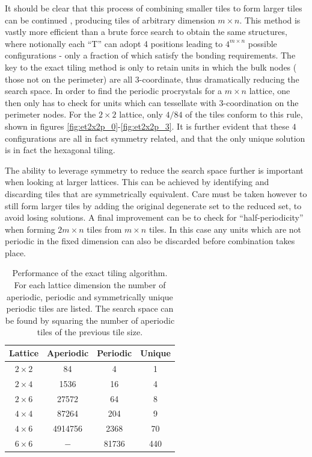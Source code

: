 It should be clear that this process of combining smaller tiles to form larger tiles can be continued \adinfinitum{}, producing tiles of arbitrary dimension $m\times n$.
This method is vastly more efficient than a brute force search to obtain the same structures, where notionally each ``T'' can adopt 4 positions leading to $4^{m\times n}$ possible configurations - only a fraction of which satisfy the bonding requirements.
The key to the exact tiling method is only to retain units in which the bulk nodes (\ie{} those not on the perimeter) are all 3\--coordinate, thus dramatically reducing the search space.
In order to find the periodic procrystals for a $m\times n$ lattice, one then only has to check for units which can tessellate with $3$\--coordination on the perimeter nodes.
For the $2\times 2$ lattice, only $4 / 84$ of the tiles conform to this rule, shown in figures \ref{fig:et2x2p_0}\--\ref{fig:et2x2p_3}.
It is further evident that these $4$ configurations are all in fact symmetry related, and that the only unique solution is in fact the hexagonal tiling.

The ability to leverage symmetry to reduce the search space further is important when looking at larger lattices. 
This can be achieved by identifying and discarding tiles that are symmetrically equivalent.
Care must be taken however to still form larger tiles by adding the original degenerate set to the reduced set, to avoid losing solutions.
A final improvement can be to check for ``half\--periodicity'' when forming $2m\times n$ tiles from $m\times n$ tiles. 
In this case any units which are not periodic in the fixed dimension can also be discarded before combination takes place.

\begin{table}[bt]
	\centering
     \caption{Performance of the exact tiling algorithm. For each lattice dimension the number of aperiodic, periodic and symmetrically unique periodic tiles are listed. The search space can be found by squaring the number of aperiodic tiles of the previous tile size. 
     }
     \label{tab:exacttiling}
     \begin{tabular}{cccc}
     \toprule
     Lattice & Aperiodic & Periodic & Unique \\
     \midrule
	 $2\times 2$ & 84 & 4 & 1 \\
	 $2\times 4$ & 1536 & 16 & 4 \\	
	 $2\times 6$ & 27572 & 64 & 8 \\	
	 $4\times 4$ & 87264 & 204 & 9 \\
	 $4\times 6$ & 4914756 & 2368 & 70  \\
	 $6\times 6$ & $-$ & 81736 & 440  \\
     \bottomrule
     \end{tabular}
\end{table}


